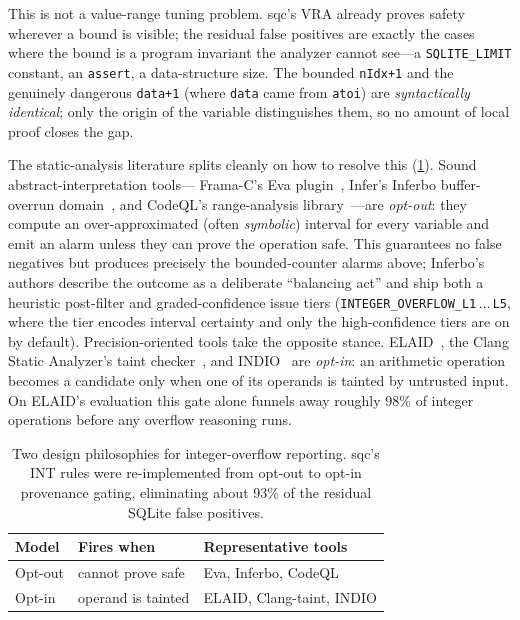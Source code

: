 This is not a value-range tuning problem.  sqc's VRA already proves
safety wherever a bound is visible; the residual false positives are
exactly the cases where the bound is a program invariant the analyzer
cannot see---a \texttt{SQLITE\_LIMIT} constant, an \texttt{assert}, a
data-structure size.  The bounded \texttt{nIdx+1} and the genuinely
dangerous \texttt{data+1} (where \texttt{data} came from
\texttt{atoi}) are \emph{syntactically identical}; only the origin of
the variable distinguishes them, so no amount of local proof closes
the gap.

The static-analysis literature splits cleanly on how to resolve this
(\cref{tab:optout-optin}).  Sound abstract-interpretation tools---%
Frama-C's Eva plugin~\cite{frama-c}, Infer's Inferbo buffer-overrun
domain~\cite{inferbo}, and CodeQL's range-analysis
library~\cite{codeql-range}---are \emph{opt-out}: they compute an
over-approximated (often \emph{symbolic}) interval for every variable
and emit an alarm unless they can prove the operation safe.  This
guarantees no false negatives but produces precisely the
bounded-counter alarms above; Inferbo's authors describe the outcome
as a deliberate ``balancing act'' and ship both a heuristic
post-filter and graded-confidence issue tiers
(\texttt{INTEGER\_OVERFLOW\_L1}\,$\ldots$\,\texttt{L5}, where the tier
encodes interval certainty and only the high-confidence tiers are on
by default).  Precision-oriented tools take the opposite stance.
ELAID~\cite{elaid}, the Clang Static Analyzer's taint
checker~\cite{clang-taint}, and INDIO~\cite{indio} are \emph{opt-in}:
an arithmetic operation becomes a candidate only when one of its
operands is tainted by untrusted input.  On ELAID's evaluation this
gate alone funnels away roughly 98\% of integer operations before any
overflow reasoning runs.

\begin{table}[t]
\centering
\footnotesize
\begin{tabular}{@{}lll@{}}
\toprule
\textbf{Model} & \textbf{Fires when} & \textbf{Representative tools} \\
\midrule
Opt-out & cannot prove safe & Eva, Inferbo, CodeQL \\
Opt-in  & operand is tainted & ELAID, Clang-taint, INDIO \\
\bottomrule
\end{tabular}
\caption{Two design philosophies for integer-overflow reporting.
sqc's INT rules were re-implemented from opt-out to opt-in provenance
gating, eliminating about 93\% of the residual SQLite false positives.}
\label{tab:optout-optin}
\end{table}

